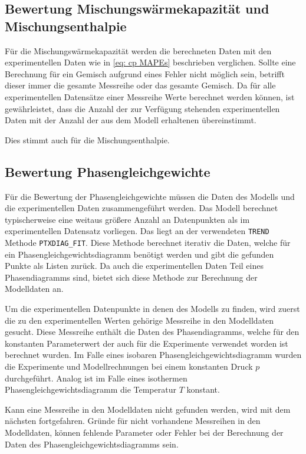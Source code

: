 \documentclass[../thesis.tex]{subfiles}
\begin{document}
\subsection{Bewertung Mischungswärmekapazität und Mischungsenthalpie}

Für die Mischungswärmekapazität werden die berechneten Daten mit den experimentellen Daten wie in \autoref{eq: cp MAPEs} beschrieben verglichen. Sollte eine Berechnung für ein Gemisch aufgrund eines Fehler nicht möglich sein, betrifft dieser immer die gesamte Messreihe oder das gesamte Gemisch. Da für alle experimentellen Datensätze einer Messreihe Werte berechnet werden können, ist gewährleistet, dass die Anzahl der zur Verfügung stehenden experimentellen Daten mit der Anzahl der aus dem Modell erhaltenen übereinstimmt.

Dies stimmt auch für die Mischungsenthalpie.

\subsection{Bewertung Phasengleichgewichte}

Für die Bewertung der Phasengleichgewichte müssen die Daten des Modells und die experimentellen Daten zusammengeführt werden. Das Modell berechnet typischerweise eine weitaus größere Anzahl an Datenpunkten als im experimentellen Datensatz vorliegen. Das liegt an der verwendeten \texttt{TREND} Methode \texttt{PTXDIAG\_FIT}. Diese Methode berechnet iterativ die Daten, welche für ein Phasengleichgewichtsdiagramm benötigt werden und gibt die gefunden Punkte als Listen zurück. Da auch die experimentellen Daten Teil eines Phasendiagramms sind, bietet sich diese Methode zur Berechnung der Modelldaten an.

Um die experimentellen Datenpunkte in denen des Modells zu finden, wird zuerst die zu den experimentellen Werten gehörige Messreihe in den Modelldaten gesucht. Diese Messreihe enthält die Daten des Phasendiagramms, welche für den konstanten Parameterwert der auch für die Experimente verwendet worden ist berechnet wurden.  Im Falle eines isobaren Phasengleichgewichtsdiagramm wurden die Experimente und Modellrechnungen bei einem konstanten Druck $ p $ durchgeführt. Analog ist im Falle eines isothermen Phasengleichgewichtsdiagramm die Temperatur $ T $ konstant.

Kann eine Messreihe in den Modelldaten nicht gefunden werden, wird mit dem nächsten fortgefahren. Gründe für nicht vorhandene Messreihen in den Modelldaten, können fehlende Parameter oder Fehler bei der Berechnung der Daten des Phasengleichgewichtsdiagramms sein.
\\
\end{document}
